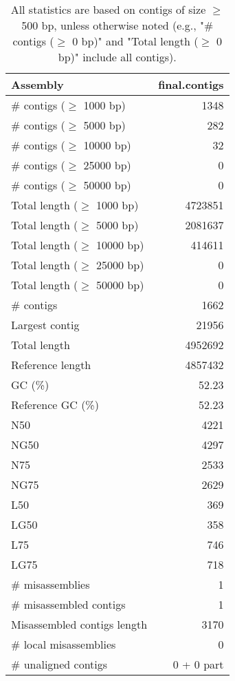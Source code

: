 \documentclass[12pt,a4paper]{article}
\begin{document}
\begin{table}[ht]
\begin{center}
\caption{All statistics are based on contigs of size $\geq$ 500 bp, unless otherwise noted (e.g., "\# contigs ($\geq$ 0 bp)" and "Total length ($\geq$ 0 bp)" include all contigs).}
\begin{tabular}{|l*{1}{|r}|}
\hline
Assembly & final.contigs \\ \hline
\# contigs ($\geq$ 1000 bp) & 1348 \\ \hline
\# contigs ($\geq$ 5000 bp) & 282 \\ \hline
\# contigs ($\geq$ 10000 bp) & 32 \\ \hline
\# contigs ($\geq$ 25000 bp) & 0 \\ \hline
\# contigs ($\geq$ 50000 bp) & 0 \\ \hline
Total length ($\geq$ 1000 bp) & 4723851 \\ \hline
Total length ($\geq$ 5000 bp) & 2081637 \\ \hline
Total length ($\geq$ 10000 bp) & 414611 \\ \hline
Total length ($\geq$ 25000 bp) & 0 \\ \hline
Total length ($\geq$ 50000 bp) & 0 \\ \hline
\# contigs & 1662 \\ \hline
Largest contig & 21956 \\ \hline
Total length & 4952692 \\ \hline
Reference length & 4857432 \\ \hline
GC (\%) & 52.23 \\ \hline
Reference GC (\%) & 52.23 \\ \hline
N50 & 4221 \\ \hline
NG50 & 4297 \\ \hline
N75 & 2533 \\ \hline
NG75 & 2629 \\ \hline
L50 & 369 \\ \hline
LG50 & 358 \\ \hline
L75 & 746 \\ \hline
LG75 & 718 \\ \hline
\# misassemblies & 1 \\ \hline
\# misassembled contigs & 1 \\ \hline
Misassembled contigs length & 3170 \\ \hline
\# local misassemblies & 0 \\ \hline
\# unaligned contigs & 0 + 0 part \\ \hline

\end{tabular}
\end{center}
\end{table}
\end{document}
